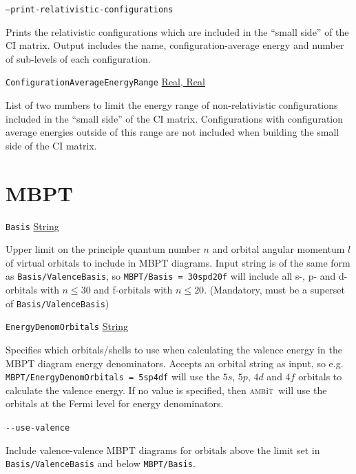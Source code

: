 \documentclass{report}
\newcommand{\ambit}{\textsc{amb}{\footnotesize i}\textsc{t}}
\begin{document}
\texttt{--print-relativistic-configurations}
\begin{adjustwidth}{1cm}{}
Prints the relativistic configurations which are included in the ``small side'' of the CI matrix.
Output includes the name, configuration-average energy and number of sub-levels of each configuration.
\end{adjustwidth}

\texttt{ConfigurationAverageEnergyRange} \uline{Real, Real}
\begin{adjustwidth}{1cm}{}
List of two numbers to limit the energy range of non-relativistic configurations included in the ``small
side'' of the CI matrix.
Configurations with configuration average energies outside of this range are not included when building
the small side of the CI matrix.
\end{adjustwidth}

\section{MBPT}

\texttt{Basis} \uline{String}
\begin{adjustwidth}{1cm}{}
Upper limit on the principle quantum number $n$ and orbital angular momentum $l$ of
virtual orbitals to include in MBPT diagrams. Input string is of the same form as
\texttt{Basis/ValenceBasis}, so \texttt{MBPT/Basis = 30spd20f} will include all s-, p- and d-orbitals
with $n \leq 30$ and f-orbitals with $n \leq 20$. (Mandatory, must be a superset of
\texttt{Basis/ValenceBasis})
\end{adjustwidth}

\texttt{EnergyDenomOrbitals} \uline{String}
\begin{adjustwidth}{1cm}{}
Specifies which orbitals/shells to use when calculating the valence energy
in the MBPT diagram energy denominators. Accepts an orbital string as input, so e.g. 
\texttt{MBPT/EnergyDenomOrbitals = 5sp4df} will use the $5s$, $5p$, $4d$ and $4f$ orbitals to calculate
the valence energy. If no value is specified, then \ambit\ will use the orbitals at the Fermi level for
energy denominators.
\end{adjustwidth}

\texttt{{-}{-}use-valence}
\begin{adjustwidth}{1cm}{}
Include valence-valence MBPT diagrams for orbitals above the limit set in \texttt{Basis/ValenceBasis} 
and below \texttt{MBPT/Basis}.
\end{adjustwidth}
\end{document}
